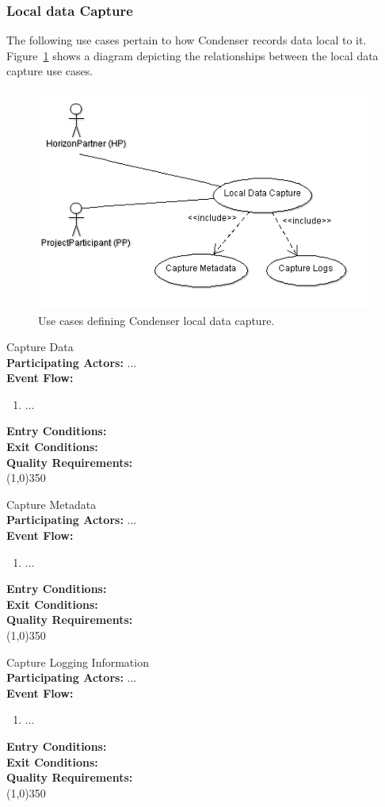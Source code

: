 \subsubsection{Local data Capture}		 
The following use cases pertain to how Condenser records data local to it. Figure~\ref{LocalDataCaptureUse} shows a diagram depicting the relationships between the local data capture use cases.
\begin{center}
	\begin{figure}[htbp]
		\includegraphics[scale=.75]{images/LocalDataCaptureUse.png}
		\caption{Use cases defining Condenser local data capture. \label{LocalDataCaptureUse}}
	\end{figure}
\end{center}
		Capture Data\\	 
		\textbf{Participating Actors:}  ... \\
		\textbf{Event Flow:}
		\begin{enumerate}
\item  ...
	    \end{enumerate}
		\textbf{Entry Conditions:}\\
		\textbf{Exit Conditions:}\\
		\textbf{Quality Requirements:}\\
		\line(1,0){350}	
		
		Capture Metadata\\	 
		\textbf{Participating Actors:}  ... \\
		\textbf{Event Flow:}
		\begin{enumerate}
\item  ...
	    \end{enumerate}
		\textbf{Entry Conditions:}\\
		\textbf{Exit Conditions:}\\
		\textbf{Quality Requirements:}\\
		\line(1,0){350}	
		
		Capture Logging Information\\	 
		\textbf{Participating Actors:}  ... \\
		\textbf{Event Flow:}
		\begin{enumerate}
\item  ...
	    \end{enumerate}
		\textbf{Entry Conditions:}\\
		\textbf{Exit Conditions:}\\
		\textbf{Quality Requirements:}\\
		\line(1,0){350}					